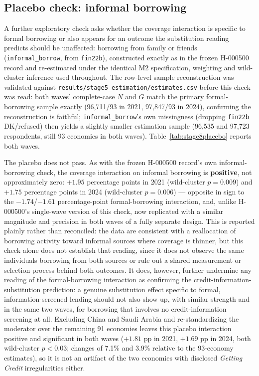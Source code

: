 

\subsection{Placebo check: informal borrowing}

A further exploratory check asks whether the coverage interaction is specific to formal
borrowing or also appears for an outcome the substitution reading predicts should be
unaffected: borrowing from family or friends (\texttt{informal\_borrow}, from
\texttt{fin22b}), constructed exactly as in the frozen H-000500 record and re-estimated
under the identical M2 specification, weighting and wild-cluster inference used
throughout. The row-level sample reconstruction was validated against
\texttt{results/stage5\_estimation/estimates.csv} before this check was read: both waves'
complete-case $N$ and $G$ match the primary formal-borrowing sample exactly
(96,711/93 in 2021, 97,847/93 in 2024), confirming the reconstruction is faithful;
\texttt{informal\_borrow}'s own missingness (dropping \texttt{fin22b} DK/refused) then
yields a slightly smaller estimation sample (96,535 and 97,723 respondents, still 93
economies in both waves). Table~\ref{tab:stage8placebo} reports both waves.

The placebo does not pass. As with the frozen H-000500 record's own informal-borrowing
check, the coverage interaction on informal borrowing is \textbf{positive}, not
approximately zero: $+1.95$ percentage points in 2021 (wild-cluster $p=0.009$) and $+1.75$
percentage points in 2024 (wild-cluster $p=0.006$) --- opposite in sign to the
$-1.74$/$-1.61$ percentage-point formal-borrowing interaction, and, unlike H-000500's
single-wave version of this check, now replicated with a similar magnitude and precision
in both waves of a fully separate design. This is reported plainly rather than
reconciled: the data are consistent with a reallocation of borrowing activity toward
informal sources where coverage is thinner, but this check alone does not establish that
reading, since it does not observe the same individuals borrowing from both sources or
rule out a shared measurement or selection process behind both outcomes. It does,
however, further undermine any reading of the formal-borrowing interaction as confirming
the credit-information-substitution prediction: a genuine substitution effect specific to
formal, information-screened lending should not also show up, with similar strength and
in the same two waves, for borrowing that involves no credit-information screening at
all. Excluding China and Saudi Arabia and re-standardizing the moderator over the
remaining 91 economies leaves this placebo interaction positive and significant in both
waves ($+1.81$ pp in 2021, $+1.69$ pp in 2024, both wild-cluster $p<0.03$; changes of 7.1\%
and 3.9\% relative to the 93-economy estimates), so it is not an artifact of the two
economies with disclosed \emph{Getting Credit} irregularities either.

